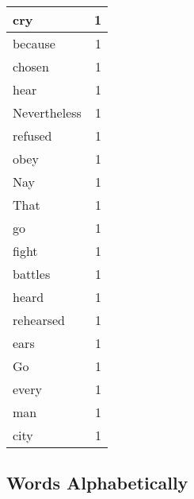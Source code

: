 \begin{center}
\begin{longtable}{l|r}
cry & 1 \\ \hline
because & 1 \\ \hline
chosen & 1 \\ \hline
hear & 1 \\ \hline
Nevertheless & 1 \\ \hline
refused & 1 \\ \hline
obey & 1 \\ \hline
Nay & 1 \\ \hline
That & 1 \\ \hline
go & 1 \\ \hline
fight & 1 \\ \hline
battles & 1 \\ \hline
heard & 1 \\ \hline
rehearsed & 1 \\ \hline
ears & 1 \\ \hline
Go & 1 \\ \hline
every & 1 \\ \hline
man & 1 \\ \hline
city & 1 \\ \hline
\end{longtable}
\end{center}



\normalsize



\subsection{Words Alphabetically}


